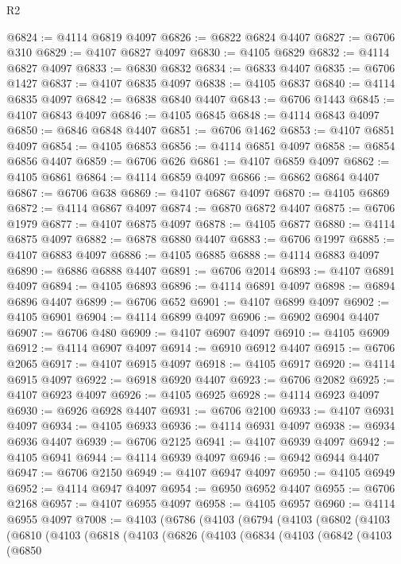 \begin{lexlean}{R2}
\begin{coremodule}
@6824 := @4114 @6819 @4097
@6826 := @6822 @6824 @4407
@6827 := @6706 @310
@6829 := @4107 @6827 @4097
@6830 := @4105 @6829
@6832 := @4114 @6827 @4097
@6833 := @6830 @6832
@6834 := @6833 @4407
@6835 := @6706 @1427
@6837 := @4107 @6835 @4097
@6838 := @4105 @6837
@6840 := @4114 @6835 @4097
@6842 := @6838 @6840 @4407
@6843 := @6706 @1443
@6845 := @4107 @6843 @4097
@6846 := @4105 @6845
@6848 := @4114 @6843 @4097
@6850 := @6846 @6848 @4407
@6851 := @6706 @1462
@6853 := @4107 @6851 @4097
@6854 := @4105 @6853
@6856 := @4114 @6851 @4097
@6858 := @6854 @6856 @4407
@6859 := @6706 @626
@6861 := @4107 @6859 @4097
@6862 := @4105 @6861
@6864 := @4114 @6859 @4097
@6866 := @6862 @6864 @4407
@6867 := @6706 @638
@6869 := @4107 @6867 @4097
@6870 := @4105 @6869
@6872 := @4114 @6867 @4097
@6874 := @6870 @6872 @4407
@6875 := @6706 @1979
@6877 := @4107 @6875 @4097
@6878 := @4105 @6877
@6880 := @4114 @6875 @4097
@6882 := @6878 @6880 @4407
@6883 := @6706 @1997
@6885 := @4107 @6883 @4097
@6886 := @4105 @6885
@6888 := @4114 @6883 @4097
@6890 := @6886 @6888 @4407
@6891 := @6706 @2014
@6893 := @4107 @6891 @4097
@6894 := @4105 @6893
@6896 := @4114 @6891 @4097
@6898 := @6894 @6896 @4407
@6899 := @6706 @652
@6901 := @4107 @6899 @4097
@6902 := @4105 @6901
@6904 := @4114 @6899 @4097
@6906 := @6902 @6904 @4407
@6907 := @6706 @480
@6909 := @4107 @6907 @4097
@6910 := @4105 @6909
@6912 := @4114 @6907 @4097
@6914 := @6910 @6912 @4407
@6915 := @6706 @2065
@6917 := @4107 @6915 @4097
@6918 := @4105 @6917
@6920 := @4114 @6915 @4097
@6922 := @6918 @6920 @4407
@6923 := @6706 @2082
@6925 := @4107 @6923 @4097
@6926 := @4105 @6925
@6928 := @4114 @6923 @4097
@6930 := @6926 @6928 @4407
@6931 := @6706 @2100
@6933 := @4107 @6931 @4097
@6934 := @4105 @6933
@6936 := @4114 @6931 @4097
@6938 := @6934 @6936 @4407
@6939 := @6706 @2125
@6941 := @4107 @6939 @4097
@6942 := @4105 @6941
@6944 := @4114 @6939 @4097
@6946 := @6942 @6944 @4407
@6947 := @6706 @2150
@6949 := @4107 @6947 @4097
@6950 := @4105 @6949
@6952 := @4114 @6947 @4097
@6954 := @6950 @6952 @4407
@6955 := @6706 @2168
@6957 := @4107 @6955 @4097
@6958 := @4105 @6957
@6960 := @4114 @6955 @4097
@7008 := @4103
    (@6786
      (@4103
        (@6794
          (@4103
            (@6802
              (@4103
                (@6810
                  (@4103
                    (@6818
                      (@4103
                        (@6826
                          (@4103
                            (@6834
                              (@4103
                                (@6842
                                  (@4103
                                    (@6850

\end{coremodule}
\end{lexlean}
